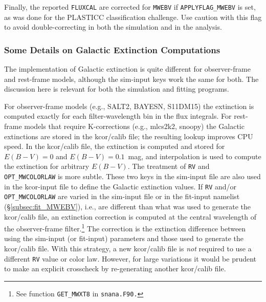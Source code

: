 \documentclass[12pt]{article}
\begin{document}
{Finally, the reported {\tt FLUXCAL} are corrected for {\tt MWEBV}
if {\tt APPLYFLAG\_MWEBV} is set, as was done for the PLASTICC 
classification challenge. Use caution with this flag to avoid
double-correcting in both the simulation and in the analysis.

\subsubsection{Some Details on Galactic Extinction Computations}
\label{sss:GALextinc_misc}

The implementation of Galactic extinction is quite different
for observer-frame and rest-frame models, although the 
sim-input keys work the same for both.
The discussion here is relevant for both the simulation
and fitting programs.

For observer-frame models (e.g., SALT2, BAYESN, S11DM15) 
the extinction is computed exactly for each filter-wavelength 
bin in the flux integrals.
For rest-frame models that require K-corrections (e.g., mlcs2k2, snoopy) 
the Galactic extinctions are stored in the kcor/calib file;
the resulting lookup improves CPU speed. In the kcor/calib file, 
the extinction is computed and stored for 
$E(B-V)=0$ and $E(B-V)=0.1$~mag, and interpolation is used 
to compute the extinction for arbitrary $E(B-V)$.
The treatment of {\tt RV} and {\tt OPT\_MWCOLORLAW} is more subtle.
These two keys in the sim-input file are also used in the 
kcor-input file to define the Galactic extinction values.
If {\tt RV} and/or {\tt OPT\_MWCOLORLAW} are varied in the 
sim-input file or in the fit-input namelist (\S\ref{subsec:fit_MWEBV}),
i.e., are different than what was used to generate the kcor/calib file, 
an extinction correction is computed at the central wavelength 
of the observer-frame 
filter.\footnote{See function {\tt GET\_MWXT8} in {\tt snana.F90.}}
The correction is the extinction difference between using the
sim-input (or fit-input) parameters and those used to generate 
the kcor/calib file.
With this strategy,  a new kcor/calib file is {\em not} required
to use a different {\tt RV} value or color law.
However, for large variations it would be prudent to make an 
explicit crosscheck by re-generating another kcor/calib file.


}
\end{document}
